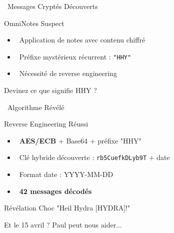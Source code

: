 \documentclass{beamer}
\begin{document}
\begin{frame}{\faLock \, Messages Cryptés Découverts}
\begin{block}{OmniNotes Suspect}
\begin{itemize}
    \item \faFileTextO \, Application de notes avec contenu chiffré
    \item \faKey \, Préfixe mystérieux récurrent : \textcolor{crimsonred}{\texttt{"HHY"}}
    \item \faCogs \, Nécessité de reverse engineering
\end{itemize}
\end{block}

\begin{center}
\end{center}

\pause
\begin{center}
\Large{\textcolor{hydroblue}{Devinez ce que signifie HHY ?}}
\end{center}
\end{frame}

\begin{frame}{\faUnlock \, Algorithme Révélé}
\begin{block}{Reverse Engineering Réussi}
\begin{itemize}
    \item \faCog \, \textbf{AES/ECB} + Base64 + préfixe "HHY"
    \item \faKey \, Clé hybride découverte : \texttt{rb5CuefkDLyb9T} + date
    \item \faCalendar \, Format date : YYYY-MM-DD
    \item \faUnlock \, \textbf{42 messages décodés}
\end{itemize}
\end{block}

\pause
\begin{alertblock}{Révélation Choc}
\centering
\Large{\textcolor{crimsonred}{"Heil Hydra [HYDRA]!"}}
\end{alertblock}

\pause
\begin{center}
\Large{\textcolor{forensicgreen}{Et le 15 avril ? Paul peut nous aider...}}
\end{center}
\end{frame}
\end{document}

